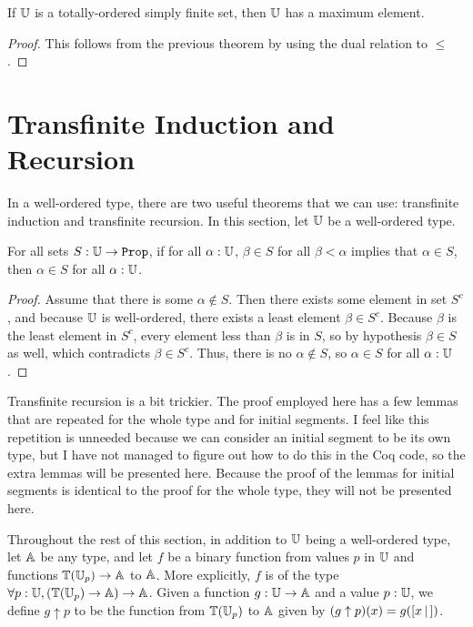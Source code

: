 \documentclass[../math.tex]{subfiles}
\begin{document}
\begin{theorem} \label{simple-finite-max}
    If $\mathbb{U}$ is a totally-ordered simply finite set, then $\mathbb{U}$ has a maximum
    element.
\end{theorem}
\begin{proof}
    This follows from the previous theorem by using the dual relation to $\leq$.
\end{proof}

\section{Transfinite Induction and Recursion}

In a well-ordered type, there are two useful theorems that we can use:
transfinite induction and transfinite recursion.  In this section, let $\mathbb{U}$ be a
well-ordered type.

\begin{theorem} \label{transfinite-induction}
    For all sets $S : \set{\U}$, if for all $\alpha : \mathbb{U}$, $\beta \in S$ for all
    $\beta < \alpha$ implies that $\alpha \in S$, then $\alpha \in S$ for all
    $\alpha : \mathbb{U}$.
\end{theorem}
\begin{proof}
    Assume that there is some $\alpha \notin S$.  Then there exists some element
    in set $S^c$, and because $\mathbb{U}$ is well-ordered, there exists a least element
    $\beta \in S^c$.  Because $\beta$ is the least element in $S^c$, every
    element less than $\beta$ is in $S$, so by hypothesis $\beta \in S$ as well,
    which contradicts $\beta \in S^c$.  Thus, there is no $\alpha \notin S$, so
    $\alpha \in S$ for all $\alpha : \mathbb{U}$.
\end{proof}

Transfinite recursion is a bit trickier.  The proof employed here has a few
lemmas that are repeated for the whole type and for initial segments.  I feel
like this repetition is unneeded because we can consider an initial segment to
be its own type, but I have not managed to figure out how to do this in the Coq
code, so the extra lemmas will be presented here.  Because the proof of the
lemmas for initial segments is identical to the proof for the whole type, they
will not be presented here.

Throughout the rest of this section, in addition to $\mathbb{U}$ being a well-ordered
type, let $\mathbb{A}$ be any type, and let $f$ be a binary function from values $p$ in
$\mathbb{U}$ and functions $\mathbb{T}(\mathbb{U}_p) \to \mathbb{A}$ to $\mathbb{A}$.  More explicitly, $f$ is of the
type $\forall p : \mathbb{U}, (\mathbb{T}(\mathbb{U}_p) \to \mathbb{A}) \to \mathbb{A}$.  Given a function $g : \mathbb{U} \to
\mathbb{A}$ and a value $p : \mathbb{U}$, we define $g \uparrow p$ to be the function from
$\mathbb{T}(\mathbb{U}_p)$ to $\mathbb{A}$ given by $(g \uparrow p)(x) = g([ x\, |\,])$.
\end{document}
